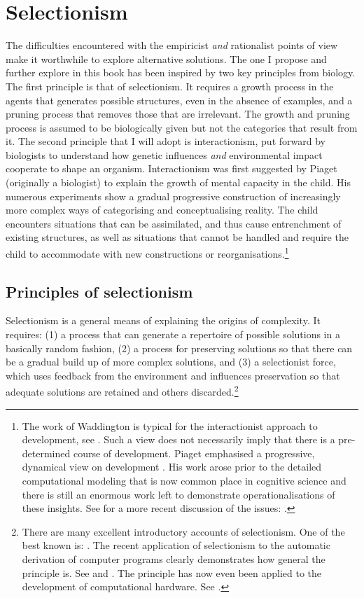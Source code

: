 \section{Selectionism}

The difficulties encountered with the empiricist
{\itshape and} rationalist points of view make it worthwhile
to explore alternative solutions. The one I propose
and further explore in this book 
has been inspired by two key principles 
from biology. The first principle is
that of selectionism. It requires 
a growth process in the agents that generates possible 
structures, even in the absence of examples, and a pruning
process that removes those
that are irrelevant. The growth and pruning
process is assumed to be biologically given
but not the categories that result from it.  
The second principle that 
I will adopt is interactionism, put forward by biologists 
to understand how genetic influences {\itshape and} environmental 
impact cooperate to shape an organism. Interactionism 
was first suggested by Piaget (originally a biologist)
to explain the growth of mental capacity in the child. 
His numerous experiments show a gradual progressive construction of 
increasingly more complex ways of categorising and 
conceptualising reality. The child encounters situations that 
can be assimilated, and thus cause entrenchment of
existing structures, as well 
as situations that cannot be handled and require 
the child to accommodate with new 
constructions or reorganisations.\footnote{
The work of Waddington is typical for the 
interactionist approach to development, see \cite{Waddington:1975}. 
Such a view does not necessarily imply that there is 
a pre-determined course of development.
Piaget emphasised a progressive, dynamical view on 
development \cite{Piaget:1985}. 
His work arose prior to the detailed
computational modeling that is now common place in 
cognitive science and there is still an enormous 
work left to demonstrate operationalisations of these
insights. See for a more recent discussion of 
the issues: \cite{Thelen:1994}.}

\subsection{Principles of selectionism}

Selectionism is a general means of explaining the origins of 
complexity. It requires: (1) a process that 
can generate a repertoire of possible solutions in a 
basically random fashion, (2) a process for preserving
solutions so that there can be a gradual build up of 
more complex solutions, and (3) a 
selectionist force, which uses
feedback from the environment and influences preservation
so that adequate solutions are retained 
and others discarded.\footnote{
There are many excellent introductory 
accounts of selectionism. One of the best
known is: \cite{Dawkins:1976}. The 
recent application of selectionism to the automatic
derivation of computer programs clearly demonstrates
how general the principle is. See \cite{Goldberg:1989} and \cite{Koza:1997}. 
The principle has now even been applied to 
the development of computational hardware. See \cite{Sipper:1998}.}

